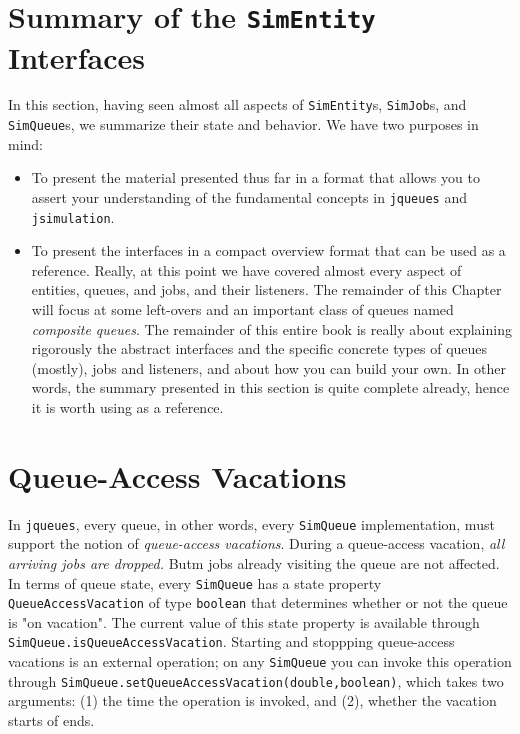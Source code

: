 \section{Summary of the \texttt{SimEntity} Interfaces}
\label{sec:guided:simentity-model}

In this section,
having seen almost all aspects of \lstinline|SimEntity|s,
\lstinline|SimJob|s,
and \lstinline|SimQueue|s,
we summarize their state and behavior.
We have two purposes in mind:
\begin{itemize}
	\item To present the material presented thus far in a format
	that allows you to assert your understanding
	of the fundamental concepts in \lstinline|jqueues|
	and \lstinline|jsimulation|.
	\item To present the interfaces in a compact overview format
	that can be used as a reference.
	Really, at this point we have covered almost every aspect
	of entities, queues, and jobs, and their listeners.
	The remainder of this Chapter will focus at some
	left-overs and an important class of queues
	named {\em composite queues}.
	The remainder of this entire book is really
	about explaining rigorously the abstract interfaces
	and the specific concrete types
	of queues (mostly), jobs and listeners,
	and about how you can build your own.
	In other words, the summary presented in this section
	is quite complete already,
	hence it is worth using as a reference.
\end{itemize}







\section{Queue-Access Vacations}
\label{sec:guided:qav}

In \lstinline|jqueues|, every queue,
  in other words, every \lstinline|SimQueue| implementation,
  must support the notion of {\em queue-access vacations}.
During a queue-access vacation,
  {\em all arriving jobs are dropped.}
Butm jobs already visiting the queue are not affected.
In terms of queue state,
  every \lstinline|SimQueue| has a state
  property \lstinline|QueueAccessVacation|
  of type \lstinline|boolean|
  that determines whether or not the
  queue is "on vacation".
The current value of this state property is available through
  \lstinline{SimQueue.isQueueAccessVacation}.
Starting and stoppping queue-access vacations
  is an external operation;
  on any \lstinline{SimQueue} you can
  invoke this operation
  through \lstinline{SimQueue.setQueueAccessVacation(double,boolean)},
  which takes two arguments: (1) the time the operation is invoked,
  and (2), whether the vacation starts of ends.

